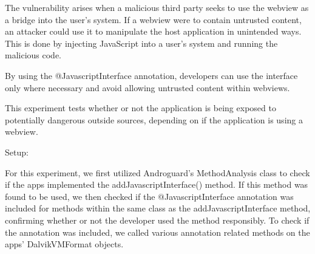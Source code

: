         The vulnerability arises when a malicious third party seeks to use 
        the webview as a bridge into the user's system. If a webview were to
        contain untrusted content, an attacker could use it to manipulate the
        host application in unintended ways. This is done by injecting JavaScript 
        into a user's system and running the malicious code.
        
        By using the @JavascriptInterface annotation, developers can use the interface
        only where necessary and avoid allowing untrusted content within webviews.

        This experiment tests whether or not the application is being exposed to
        potentially dangerous outside sources, depending on if the application is
        using a webview.

        Setup:
        
        For this experiment, we first utilized Androguard's MethodAnalysis class to check if the apps 
        implemented the addJavascriptInterface() method. If this method was found to 
        be used, we then checked if the @JavascriptInterface annotation was included 
        for methods within the same class as the addJavascriptInterface method, confirming whether or not 
        the developer used the method responsibly. To check if the annotation was included, we called 
        various annotation related methods on the apps' DalvikVMFormat objects.
